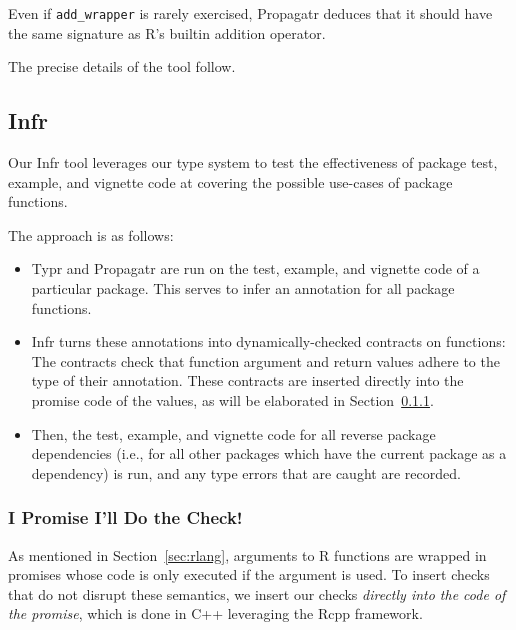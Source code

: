 \documentclass[sigplan,10pt,review,anonymous]{acmart}\settopmatter{printfolios=true,printccs=false,printacmref=false}
\begin{document}
Even if {\tt add\_wrapper} is rarely exercised, Propagatr deduces that it should have the same signature as R's builtin addition operator.

The precise details of the tool follow.

%
%
%
%
\subsection{Infr}

Our Infr tool leverages our type system to test the effectiveness of package test, example, and vignette code at covering the possible use-cases of package functions.

The approach is as follows:

\begin{itemize}
\item Typr and Propagatr are run on the test, example, and vignette code of a particular package.
This serves to infer an annotation for all package functions.
\item Infr turns these annotations into dynamically-checked contracts on functions:
The contracts check that function argument and return values adhere to the type of their annotation.
These contracts are inserted directly into the promise code of the values, as will be elaborated in Section~\ref{subsubsec:promise}.
\item Then, the test, example, and vignette code for all reverse package dependencies (i.e., for all other packages which have the current package as a dependency) is run, and any type errors that are caught are recorded.
\end{itemize}


%
%
\subsubsection{I Promise I'll Do the Check!}
\label{subsubsec:promise}

As mentioned in Section~\ref{sec:rlang}, arguments to R functions are wrapped in promises whose code is only executed if the argument is used.
To insert checks that do not disrupt these semantics, we insert our checks {\it directly into the code of the promise}, which is done in C++ leveraging the Rcpp framework.
\end{document}
